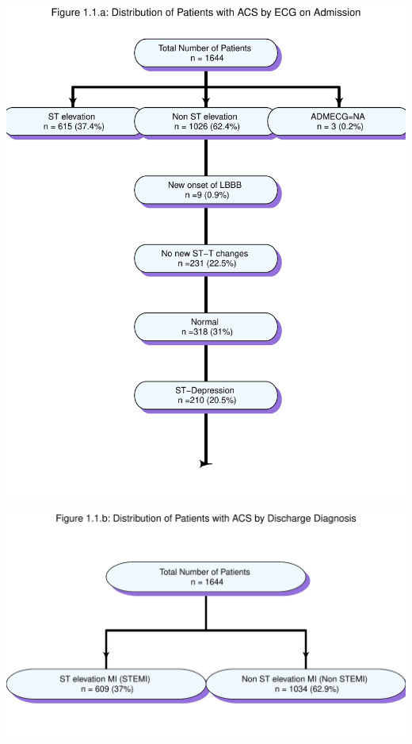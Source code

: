 \documentclass[
]{article}
\begin{document}
\includegraphics{‏‏ACSIS_2024_v1_with_trend_pdf_files/figure-latex/unnamed-chunk-5-1.pdf}

\pagebreak

\includegraphics{‏‏ACSIS_2024_v1_with_trend_pdf_files/figure-latex/unnamed-chunk-6-1.pdf}

\pagebreak

~
\end{document}
